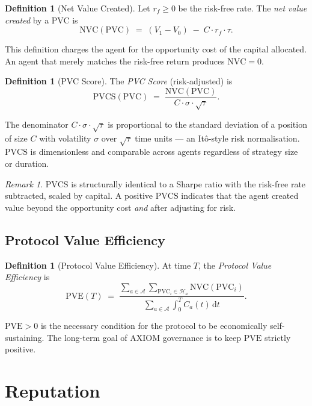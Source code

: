 \documentclass[11pt,a4paper]{article}
\theoremstyle{plain}
\theoremstyle{definition}
\newtheorem{definition}[theorem]{Definition}
\theoremstyle{remark}
\newtheorem{remark}[theorem]{Remark}
\newcommand{\PVC}{\mathrm{PVC}}
\newcommand{\PVCS}{\mathrm{PVCS}}
\newcommand{\NVC}{\mathrm{NVC}}
\newcommand{\PVE}{\mathrm{PVE}}
\begin{document}
\begin{definition}[Net Value Created]
\label{def:nvc}
Let $r_f \ge 0$ be the risk-free rate. The \emph{net value created} by a PVC is
\[
  \NVC(\PVC) \;=\; (V_1 - V_0) \;-\; C \cdot r_f \cdot \tau.
\]
\end{definition}

This definition charges the agent for the opportunity cost of the capital
allocated. An agent that merely matches the risk-free return produces
$\NVC = 0$.

\begin{definition}[PVC Score]
\label{def:pvcs}
The \emph{PVC Score} (risk-adjusted) is
\[
  \PVCS(\PVC)
  \;=\;
  \frac{\NVC(\PVC)}{C \cdot \sigma \cdot \sqrt{\tau}}.
\]
\end{definition}

The denominator $C \cdot \sigma \cdot \sqrt{\tau}$ is proportional to the
standard deviation of a position of size $C$ with volatility $\sigma$ over
$\sqrt{\tau}$ time units — an Itô-style risk normalisation. $\PVCS$ is
dimensionless and comparable across agents regardless of strategy size or
duration.

\begin{remark}
$\PVCS$ is structurally identical to a Sharpe ratio with the risk-free rate
subtracted, scaled by capital. A positive $\PVCS$ indicates that the agent
created value beyond the opportunity cost \emph{and} after adjusting for risk.
\end{remark}

\subsection{Protocol Value Efficiency}

\begin{definition}[Protocol Value Efficiency]
At time $T$, the \emph{Protocol Value Efficiency} is
\[
  \PVE(T)
  \;=\;
  \frac{\displaystyle\sum_{a \in \mathcal{A}} \sum_{\PVC_i \in \mathcal{H}_a} \NVC(\PVC_i)}
       {\displaystyle\sum_{a \in \mathcal{A}} \int_0^T C_a(t)\,\mathrm{d}t}.
\]
\end{definition}

$\PVE > 0$ is the necessary condition for the protocol to be economically
self-sustaining. The long-term goal of AXIOM governance is to keep $\PVE$
strictly positive.

\section{Reputation}
\end{document}
